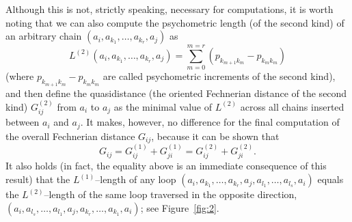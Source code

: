 \documentclass[nojss]{jss}
\begin{document}
Although this is not, strictly speaking, necessary for computations,
it is worth noting that we can also compute the psychometric length (of the second kind) of an arbitrary
chain $\left(a_{i},a_{k_{1}},\ldots,a_{k_{r}},a_{j}\right)$ as
\[
L^{(2)}\left(a_{i},a_{k_{1}},\ldots,a_{k_{r}},a_{j}\right)=\sum_{m=0}^{m=r}\left(p_{k_{m+1}k_{m}}-p_{k_{m}k_{m}}\right)
\]
(where $p_{k_{m+1}k_{m}}-p_{k_{m}k_{m}}$ are called psychometric increments of the second kind), and then define the quasidistance 
(the oriented Fechnerian distance of the second kind) $G_{ij}^{(2)}$ from $a_{i}$ to $a_{j}$ as the minimal value of $L^{(2)}$ 
across all chains inserted between $a_{i}$ and $a_{j}$. It makes, however, no difference
for the final computation of the overall Fechnerian distance $G_{ij}$, because
it can be shown \citep[see, e.g.,][]{DzhCol2006b} that 
\[
G_{ij}=G_{ij}^{(1)}+G_{ji}^{(1)}=G_{ij}^{(2)}+G_{ji}^{(2)}.
\]
It also holds (in fact, the equality above is an immediate consequence of this result) that the $L^{(1)}$--length 
of any loop $\left(a_{i},a_{k_{1}},\ldots,a_{k_{r}},a_{j},a_{l_{1}},\ldots,a_{l_{s}},a_{i}\right)$
equals the $L^{(2)}$--length of the same loop traversed in the opposite direction, 
$\left(a_{i},a_{l_{s}},\ldots,a_{l_{1}},a_{j},a_{k_{r}},\ldots,a_{k_{1}},a_{i}\right)$; 
see Figure~\ref{fig:2}.
\end{document}
